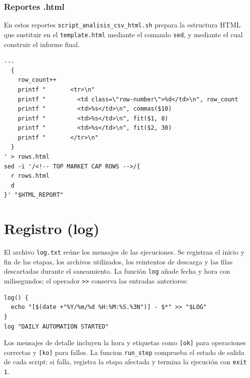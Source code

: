 \documentclass[11pt,a4paper]{article}
\begin{document}
\subsubsection{Reportes .html}
En estos reportes \texttt{script\_analisis\_csv\_html.sh} prepara la estructura HTML que sustituir en el \texttt{template.html} mediante el comando \texttt{sed}, y mediante el cual construir el informe final. 
\begin{center}
\begin{minipage}{0.7575\textwidth}
\begin{lstlisting}
...
  {
    row_count++
    printf "       <tr>\n"
    printf "         <td class=\"row-number\">%d</td>\n", row_count
    printf "         <td>%s</td>\n", commas($10)
    printf "         <td>%s</td>\n", fit($1, 8)
    printf "         <td>%s</td>\n", fit($2, 30)
    printf "       </tr>\n"
  }
' > rows.html
sed -i '/<!-- TOP MARKET CAP ROWS -->/{
  r rows.html
  d
}' "$HTML_REPORT"
\end{lstlisting}
\end{minipage}
\end{center}

\section{Registro (log)}

El archivo \texttt{log.txt} reúne los mensajes de las ejecuciones.
Se registran el inicio y fin de las etapas, los archivos utilizados,
los reintentos de descarga y las filas descartadas durante el saneamiento.
La función \texttt{log} añade fecha y hora con milisegundos; el operador
\texttt{>>} conserva las entradas anteriores:

\begin{lstlisting}
log() {
  echo "[$(date +"%Y/%m/%d %H:%M:%S.%3N")] - $*" >> "$LOG"
}
log "DAILY AUTOMATION STARTED"
\end{lstlisting}

Los mensajes de detalle incluyen la hora y etiquetas como
\texttt{[ok]} para operaciones correctas y \texttt{[ko]} para fallos.
La funcion \texttt{run\_step} comprueba el estado de salida de cada
script: si falla, registra la etapa afectada y termina la ejecución
con \texttt{exit 1}.
\end{document}
